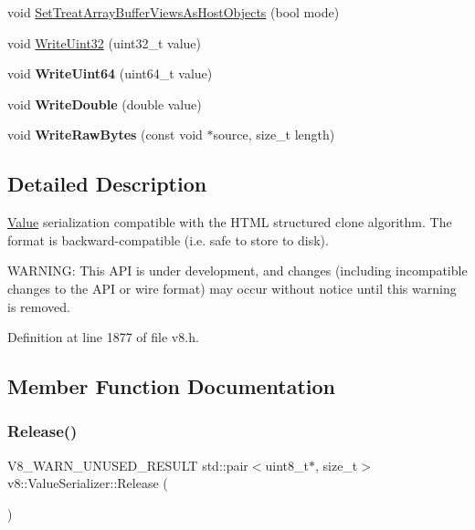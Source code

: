 \begin{DoxyCompactItemize}
\item 
void \mbox{\hyperlink{classv8_1_1ValueSerializer_ae5e570983dfe928e15d6cc56755248c4}{Set\+Treat\+Array\+Buffer\+Views\+As\+Host\+Objects}} (bool mode)
\item 
void \mbox{\hyperlink{classv8_1_1ValueSerializer_a8345af97eb58727384cab6a2738924d1}{Write\+Uint32}} (uint32\+\_\+t value)
\item 
\mbox{\label{classv8_1_1ValueSerializer_a48a33b02dc8dd383be655e5627c0a070}} 
void {\bfseries Write\+Uint64} (uint64\+\_\+t value)
\item 
\mbox{\label{classv8_1_1ValueSerializer_a4da99527143807156385004385e98ed8}} 
void {\bfseries Write\+Double} (double value)
\item 
\mbox{\label{classv8_1_1ValueSerializer_ae01d5c86517fad7ad1c191b9ff6c30e7}} 
void {\bfseries Write\+Raw\+Bytes} (const void $\ast$source, size\+\_\+t length)
\end{DoxyCompactItemize}


\subsection{Detailed Description}
\mbox{\hyperlink{classv8_1_1Value}{Value}} serialization compatible with the H\+T\+ML structured clone algorithm. The format is backward-\/compatible (i.\+e. safe to store to disk).

W\+A\+R\+N\+I\+NG\+: This A\+PI is under development, and changes (including incompatible changes to the A\+PI or wire format) may occur without notice until this warning is removed. 

Definition at line 1877 of file v8.\+h.



\subsection{Member Function Documentation}
\mbox{\label{classv8_1_1ValueSerializer_abab0c48c963cd11f98478a4ccc04509c}} 
\subsubsection{\texorpdfstring{Release()}{Release()}}
{\footnotesize\ttfamily V8\+\_\+\+W\+A\+R\+N\+\_\+\+U\+N\+U\+S\+E\+D\+\_\+\+R\+E\+S\+U\+LT std\+::pair$<$uint8\+\_\+t$\ast$, size\+\_\+t$>$ v8\+::\+Value\+Serializer\+::\+Release (\begin{DoxyParamCaption}{ }\end{DoxyParamCaption})}

